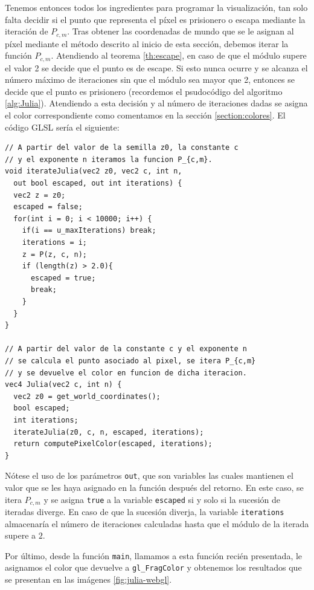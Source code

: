 Tenemos entonces todos los ingredientes para programar la visualización, tan solo falta decidir si el punto que representa el píxel es prisionero o escapa mediante la iteración de $P_{c,m}$. Tras obtener las coordenadas de mundo que se le asignan al píxel mediante el método descrito al inicio de esta sección, debemos iterar la función $P_{c,m}$. Atendiendo al teorema \ref{th:escape}, en caso de que el módulo supere el valor 2 se decide que el punto es de escape. Si esto nunca ocurre y se alcanza el número máximo de iteraciones sin que el módulo sea mayor que 2, entonces se decide que el punto es prisionero (recordemos el psudocódigo del algoritmo \ref{alg:Julia}). Atendiendo a esta decisión y al número de iteraciones dadas se asigna el color correspondiente como comentamos en la sección \ref{section:colores}. El código GLSL sería el siguiente:

\begin{lstlisting}
// A partir del valor de la semilla z0, la constante c 
// y el exponente n iteramos la funcion P_{c,m}.
void iterateJulia(vec2 z0, vec2 c, int n, 
  out bool escaped, out int iterations) {  
  vec2 z = z0;
  escaped = false;
  for(int i = 0; i < 10000; i++) {
    if(i == u_maxIterations) break;
    iterations = i;
    z = P(z, c, n);
    if (length(z) > 2.0){
      escaped = true;
      break;
    }
  }
}

// A partir del valor de la constante c y el exponente n
// se calcula el punto asociado al pixel, se itera P_{c,m}
// y se devuelve el color en funcion de dicha iteracion.
vec4 Julia(vec2 c, int n) {
  vec2 z0 = get_world_coordinates();
  bool escaped;
  int iterations;
  iterateJulia(z0, c, n, escaped, iterations);
  return computePixelColor(escaped, iterations);
}
\end{lstlisting}

Nótese el uso de los parámetros \verb|out|, que son variables las cuales mantienen el valor que se les haya asignado en la función después del retorno. En este caso, se itera $P_{c,m}$ y se asigna \verb|true| a la variable \verb|escaped| si y solo si la sucesión de iteradas diverge. En caso de que la sucesión diverja, la variable \verb|iterations| almacenaría el número de iteraciones calculadas hasta que el módulo de la iterada supere a $2$. 

Por último, desde la función \verb|main|, llamamos a esta función recién presentada, le asignamos el color que devuelve a \verb|gl_FragColor| y obtenemos los resultados que se presentan en las imágenes \ref{fig:julia-webgl}.  

